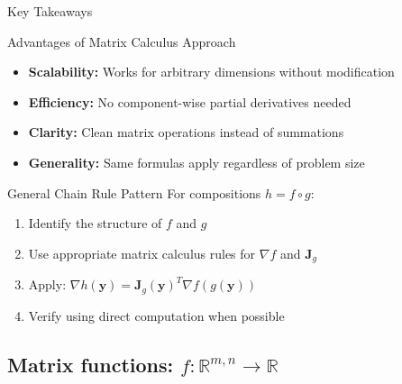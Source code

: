 \documentclass[aspectratio=1610]{beamer}
\begin{document}
\begin{frame}{Key Takeaways}
  \begin{block}{Advantages of Matrix Calculus Approach}
    \begin{itemize}
      \item \textbf{Scalability:} Works for arbitrary dimensions without modification
      \item \textbf{Efficiency:} No component-wise partial derivatives needed
      \item \textbf{Clarity:} Clean matrix operations instead of summations
      \item \textbf{Generality:} Same formulas apply regardless of problem size
    \end{itemize}
  \end{block}
  
  \begin{block}{General Chain Rule Pattern}
    For compositions $h = f \circ g$:
    \begin{enumerate}
      \item Identify the structure of $f$ and $g$
      \item Use appropriate matrix calculus rules for $\nabla f$ and $\mathbf{J}_g$
      \item Apply: $\nabla h(\mathbf{y}) = \mathbf{J}_g(\mathbf{y})^T \nabla f(g(\mathbf{y}))$
      \item Verify using direct computation when possible
    \end{enumerate}
  \end{block}
\end{frame}

\subsection{Matrix functions: $f:\mathbb{R}^{m,n} \to \mathbb{R}$}
\end{document}
